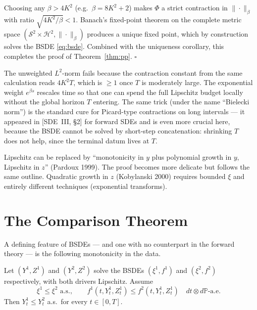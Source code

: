 \documentclass{article}
\newcommand{\Prob}{\mathbb{P}}
\newcommand{\Sc}{\mathcal{S}}
\newcommand{\Hc}{\mathcal{H}}
\begin{document}
\noindent Choosing any $\beta > 4K^2$ (e.g.\ $\beta = 8 K^2 + 2$) makes $\Phi$ a strict contraction in $\|\cdot\|_\beta$ with ratio $\sqrt{4K^2/\beta} < 1$. Banach's fixed-point theorem on the complete metric space $(\Sc^2 \times \Hc^2, \|\cdot\|_\beta)$ produces a unique fixed point, which by construction solves the BSDE \eqref{eq:bsde}. Combined with the uniqueness corollary, this completes the proof of Theorem~\ref{thm:pp}. $\square$

\begin{remark}
The unweighted $L^2$-norm fails because the contraction constant from the same calculation reads $4 K^2 T$, which is $\ge 1$ once $T$ is moderately large. The exponential weight $e^{\beta s}$ rescales time so that one can spend the full Lipschitz budget locally without the global horizon $T$ entering. The same trick (under the name ``Bielecki norm'') is the standard cure for Picard-type contractions on long intervals --- it appeared in [SDE~III, \S2] for forward SDEs and is even more crucial here, because the BSDE cannot be solved by short-step concatenation: shrinking $T$ does not help, since the terminal datum lives at $T$.
\end{remark}

\begin{remark}
Lipschitz can be replaced by ``monotonicity in $y$ plus polynomial growth in $y$, Lipschitz in $z$'' (Pardoux 1999). The proof becomes more delicate but follows the same outline. Quadratic growth in $z$ (Kobylanski 2000) requires bounded $\xi$ and entirely different techniques (exponential transforms).
\end{remark}

\section{The Comparison Theorem}

A defining feature of BSDEs --- and one with no counterpart in the forward theory --- is the following monotonicity in the data.

\begin{theorem}[Comparison]\label{thm:comparison}
Let $(Y^1, Z^1)$ and $(Y^2, Z^2)$ solve the BSDEs $(\xi^1, f^1)$ and $(\xi^2, f^2)$ respectively, with both drivers Lipschitz. Assume
\[
  \xi^1 \le \xi^2 \text{ a.s.}, \qquad f^1(t, Y^1_t, Z^1_t) \le f^2(t, Y^1_t, Z^1_t) \quad dt \otimes d\Prob\text{-a.e.}
\]
Then $Y^1_t \le Y^2_t$ a.s.\ for every $t \in [0, T]$.
\end{theorem}
\end{document}
